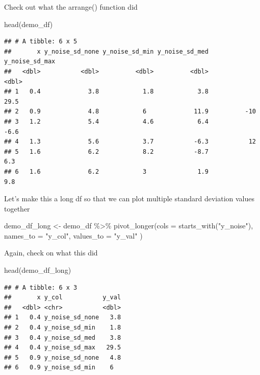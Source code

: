 \documentclass[
]{book}
\newenvironment{Shaded}{\begin{snugshade}}{\end{snugshade}}
\newcommand{\AttributeTok}[1]{\textcolor[rgb]{0.77,0.63,0.00}{#1}}
\newcommand{\FunctionTok}[1]{\textcolor[rgb]{0.00,0.00,0.00}{#1}}
\newcommand{\NormalTok}[1]{#1}
\newcommand{\OtherTok}[1]{\textcolor[rgb]{0.56,0.35,0.01}{#1}}
\newcommand{\SpecialCharTok}[1]{\textcolor[rgb]{0.00,0.00,0.00}{#1}}
\newcommand{\StringTok}[1]{\textcolor[rgb]{0.31,0.60,0.02}{#1}}
\begin{document}
Check out what the arrange() function did

\begin{Shaded}
\begin{Highlighting}[]
\FunctionTok{head}\NormalTok{(demo\_df)}
\end{Highlighting}
\end{Shaded}

\begin{verbatim}
## # A tibble: 6 x 5
##       x y_noise_sd_none y_noise_sd_min y_noise_sd_med y_noise_sd_max
##   <dbl>           <dbl>          <dbl>          <dbl>          <dbl>
## 1   0.4             3.8            1.8            3.8           29.5
## 2   0.9             4.8            6             11.9          -10  
## 3   1.2             5.4            4.6            6.4           -6.6
## 4   1.3             5.6            3.7           -6.3           12  
## 5   1.6             6.2            8.2           -8.7            6.3
## 6   1.6             6.2            3              1.9            9.8
\end{verbatim}

Let's make this a long df so that we can plot multiple standard deviation values together

\begin{Shaded}
\begin{Highlighting}[]
\NormalTok{demo\_df\_long }\OtherTok{\textless{}{-}}\NormalTok{ demo\_df }\SpecialCharTok{\%\textgreater{}\%} 
  \FunctionTok{pivot\_longer}\NormalTok{(}\AttributeTok{cols =} \FunctionTok{starts\_with}\NormalTok{(}\StringTok{"y\_noise"}\NormalTok{),}
               \AttributeTok{names\_to =} \StringTok{"y\_col"}\NormalTok{,}
               \AttributeTok{values\_to =} \StringTok{"y\_val"}
\NormalTok{  )}
\end{Highlighting}
\end{Shaded}

Again, check on what this did

\begin{Shaded}
\begin{Highlighting}[]
\FunctionTok{head}\NormalTok{(demo\_df\_long)}
\end{Highlighting}
\end{Shaded}

\begin{verbatim}
## # A tibble: 6 x 3
##       x y_col           y_val
##   <dbl> <chr>           <dbl>
## 1   0.4 y_noise_sd_none   3.8
## 2   0.4 y_noise_sd_min    1.8
## 3   0.4 y_noise_sd_med    3.8
## 4   0.4 y_noise_sd_max   29.5
## 5   0.9 y_noise_sd_none   4.8
## 6   0.9 y_noise_sd_min    6
\end{verbatim}
\end{document}
